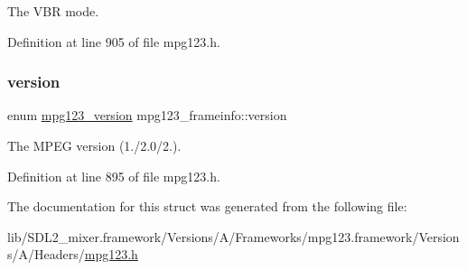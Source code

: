 The V\+BR mode. 

Definition at line 905 of file mpg123.\+h.

\mbox{\label{structmpg123__frameinfo_aa1276e21b0fd007148ac85b6290de057}} 
\subsubsection{\texorpdfstring{version}{version}}
{\footnotesize\ttfamily enum \mbox{\hyperlink{group__mpg123__status_ga0553c78534d6d130df2d1dc0df675748}{mpg123\+\_\+version}} mpg123\+\_\+frameinfo\+::version}

The M\+P\+EG version (1./2.0/2.). 

Definition at line 895 of file mpg123.\+h.



The documentation for this struct was generated from the following file\+:\begin{DoxyCompactItemize}
\item 
lib/\+S\+D\+L2\+\_\+mixer.\+framework/\+Versions/\+A/\+Frameworks/mpg123.\+framework/\+Versions/\+A/\+Headers/\mbox{\hyperlink{mpg123_8h}{mpg123.\+h}}\end{DoxyCompactItemize}
